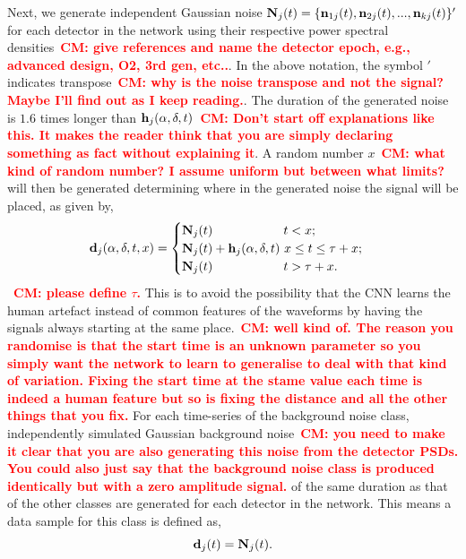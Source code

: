 \documentclass[aps,twocolumn,showpacs,groupedaddress, nofootinbib]{revtex4}  %
\newcommand{\cm}[1]{\textbf{\textcolor{red}{CM: #1}}}
\begin{document}
%
%
Next, we generate independent Gaussian noise $\bold{N}_j(t) =
\{\bold{n}_{1j}(t), \bold{n}_{2j}(t), ..., \bold{n}_{kj}(t)\}'$ for each
detector in the network using their respective power spectral
densities~\cm{give references and name the detector epoch, e.g., advanced
design, O2, 3rd gen, etc..}. In the above notation, the symbol $'$ indicates
transpose~\cm{why is the noise transpose and not the signal? Maybe I'll find
out as I keep reading.}. 
The duration of the generated noise is $1.6$ times longer than
$\bold{h}_j(\alpha, \delta, t)$~\cm{Don't start off explanations like this. It
makes the reader think that you are simply declaring something as fact without
explaining it}. A random number $x$~\cm{what kind of random number? I assume
uniform but between what limits?} will then be generated determining where in
the generated noise the signal will be placed, as given by,
%
\begin{equation}
\bold{d}_j(\alpha, \delta, t, x)=
\begin{cases}
\bold{N}_j(t)~~~~~~~~~~~~~~~~~t < x; \\
\bold{N}_j(t) + \bold{h}_j(\alpha, \delta, t)~x \leq t \leq \tau + x; \\
\bold{N}_j(t)~~~~~~~~~~~~~~~~~t > \tau + x. \\
\end{cases}
\end{equation}
%
~\cm{please define $\tau$.} This is to avoid the possibility that the \ac{CNN}
learns the human artefact instead of common features of the waveforms by having
the signals always starting at the same place.~\cm{well kind of. The reason you
randomise is that the start time is an unknown parameter so you simply want the
network to learn to generalise to deal with that kind of variation. Fixing the
start time at the stame value each time is indeed a human feature but so is
fixing the distance and all the other things that you fix.} For each
time-series of the background noise class, independently simulated Gaussian
background noise~\cm{you need to make it clear that you are also generating
this noise from the detector PSDs. You could also just say that the background
noise class is produced identically but with a zero amplitude signal.} of the
same duration as that of the other classes are generated for each detector in
the network. This means a data sample for this class is defined as,
%
\begin{equation}\label{eq:noise}
 \bold{d}_j(t) = \bold{N}_j(t).
\end{equation}
\end{document}
